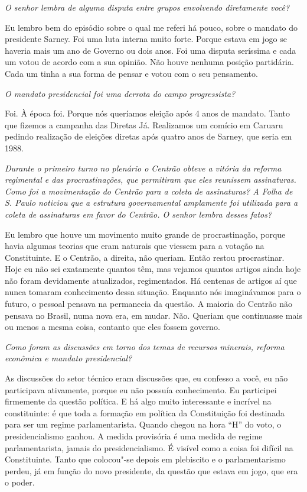 \medskip

\emph{O senhor lembra de alguma disputa entre grupos envolvendo
diretamente você?}

Eu lembro bem do episódio sobre o qual me referi há
pouco, sobre o mandato do presidente Sarney. Foi uma luta interna muito
forte. Porque estava em jogo se haveria mais um ano de Governo ou dois
anos. Foi uma disputa seríssima e cada um votou de acordo com a sua
opinião. Não houve nenhuma posição partidária. Cada um tinha a sua forma
de pensar e votou com o seu pensamento.

\medskip

\emph{O mandato presidencial foi uma derrota do campo progressista?}

Foi. À época foi. Porque nós queríamos eleição após 4
anos de mandato. Tanto que fizemos a campanha das Diretas Já. Realizamos
um comício em Caruaru pedindo realização de eleições diretas após quatro
anos de Sarney, que seria em 1988.

\medskip

\emph{Durante o primeiro turno no plenário o Centrão obteve a vitória
da reforma regimental e das procrastinações, que permitiram que eles
reunissem assinaturas. Como foi a movimentação do Centrão para a coleta
de assinaturas? A Folha de S. Paulo noticiou que a estrutura
governamental amplamente foi utilizada para a coleta de assinaturas em
favor do Centrão. O senhor lembra desses fatos?}

Eu lembro que houve um movimento muito grande de
procrastinação, porque havia algumas teorias que eram naturais que
viessem para a votação na Constituinte. E o Centrão, a direita, não
queriam. Então restou procrastinar. Hoje eu não sei exatamente quantos
têm, mas vejamos quantos artigos ainda hoje não foram devidamente
atualizados, regimentados. Há centenas de artigos aí que nunca tomaram
conhecimento dessa situação. Enquanto nós imaginávamos para o futuro, o
pessoal pensava na permanecia da questão. A maioria do Centrão não
pensava no Brasil, numa nova era, em mudar. Não. Queriam que continuasse
mais ou menos a mesma coisa, contanto que eles fossem governo.

\medskip

\emph{Como foram as discussões em torno dos temas de recursos
minerais, reforma econômica e mandato presidencial?}

As discussões do setor técnico eram discussões que, eu
confesso a você, eu não participava ativamente, porque eu não possuía
conhecimento. Eu participei firmemente da questão política. E há algo
muito interessante e incrível na constituinte: é que toda a formação em
política da Constituição foi destinada para ser um regime
parlamentarista. Quando chegou na hora ``H'' do voto, o presidencialismo
ganhou. A medida provisória é uma medida de regime parlamentarista,
jamais do presidencialismo. É visível como a coisa foi difícil na
Constituinte. Tanto que colocou"-se depois em plebiscito e o
parlamentarismo perdeu, já em função do novo presidente, da questão que
estava em jogo, que era o poder.

